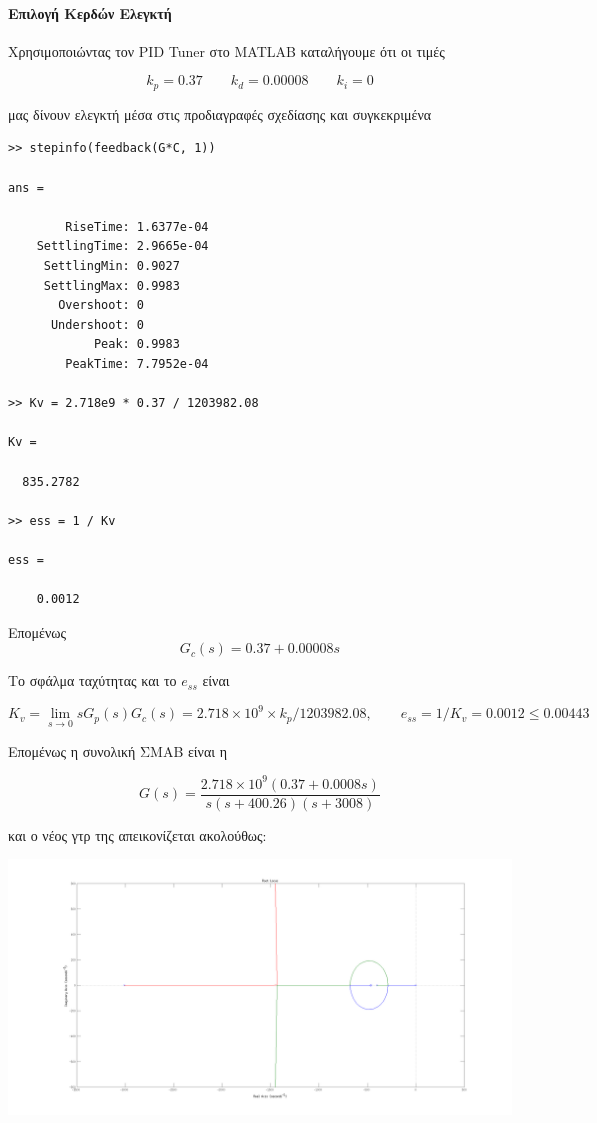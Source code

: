 \documentclass[a4paper,oneside, 10pt]{article}
\begin{document}
\paragraph{Επιλογή Κερδών Ελεγκτή} Χρησιμοποιώντας τον PID Tuner στο MATLAB καταλήγουμε ότι οι τιμές 

$$k_p = 0.37  \qquad k_d = 0.00008 \qquad k_i  = 0$$  

μας δίνουν ελεγκτή μέσα στις προδιαγραφές σχεδίασης και συγκεκριμένα

\begin{verbatim}
>> stepinfo(feedback(G*C, 1))

ans = 

        RiseTime: 1.6377e-04
    SettlingTime: 2.9665e-04
     SettlingMin: 0.9027
     SettlingMax: 0.9983
       Overshoot: 0
      Undershoot: 0
            Peak: 0.9983
        PeakTime: 7.7952e-04

>> Kv = 2.718e9 * 0.37 / 1203982.08

Kv =

  835.2782

>> ess = 1 / Kv

ess =

    0.0012

\end{verbatim}
  
Επομένως $$G_c(s) = 0.37 + 0.00008s$$  
  
  
Το σφάλμα ταχύτητας και το $e_{ss}$ είναι 

$$K_v = \lim_{s \to 0} s G_p(s) G_c(s) = 2.718 \times 10^9 \times k_p / 1203982.08, \qquad e_{ss} = 1 / K_v = 0.0012 \le 0.00443 $$  
  
Επομένως η συνολική ΣΜΑΒ είναι η 

$$G(s) = \frac {2.718 \times 10^9 (0.37 + 0.0008s)} {s(s + 400.26)(s + 3008)}$$  

και ο νέος γτρ της απεικονίζεται ακολούθως:

 \includegraphics[width=\textwidth]{pd2_rlocus.png}
\end{document}
